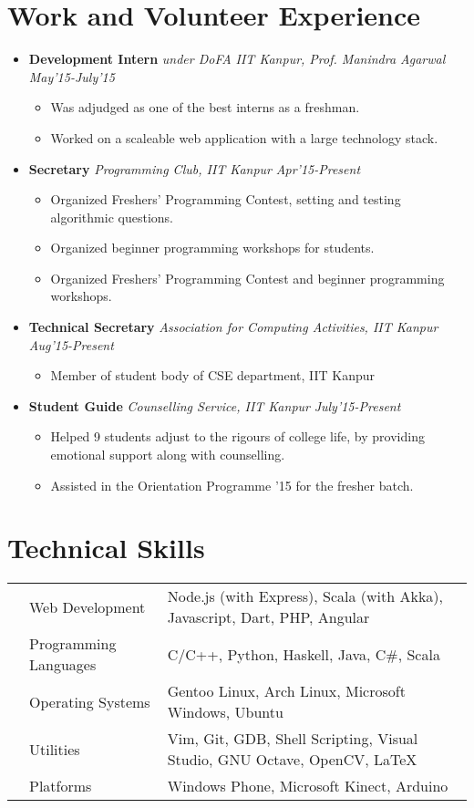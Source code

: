 \documentclass[11pt,a4paper]{moderncv}
\newcommand{\experience}[4]{
\vspace{0.1cm}
\item \textbf{\large{#1}} \emph{#2} \hfill \textit{#3}
  \begin{itemize}[leftmargin=*]
    \setlength\itemsep{0em} #4
  \end{itemize}
}
\newcommand{\onepage}[1]{
\ifdefined\onep
#1
\fi
}
\newcommand{\twopage}[1]{
\ifdefined\twop
#1
\fi
}
\newcommand{\secspace}{
\onepage{\vspace{-0.27cm}}
\twopage{\vspace{-0.1cm}}
}
\newcommand{\secbelow}{
\onepage{\vspace{-0.07cm}}
}
\begin{document}
\section*{Work and Volunteer Experience}
\secbelow
\begin{itemize}
  \twopage{\setlength\itemsep{0.5em}}
    \experience{Development Intern}{under DoFA IIT Kanpur, Prof. Manindra Agarwal}{May'15-July'15}{
      \item Was adjudged as one of the best interns as a freshman.
      \item Worked on a scaleable web application with a large technology stack.
      }

    \experience{Secretary}{Programming Club, IIT Kanpur}{Apr'15-Present}{
      \twopage{
      \item Organized Freshers' Programming Contest, setting and testing algorithmic questions.
      \item Organized beginner programming workshops for students.
      }
      \onepage{
      \item Organized Freshers' Programming Contest and beginner programming workshops.
      }
    }

    \experience{Technical Secretary}{Association for Computing Activities, IIT Kanpur}{Aug'15-Present}{
      \item Member of student body of CSE department, IIT Kanpur
      }
      
    \twopage{
      \experience{Student Guide}{Counselling Service, IIT Kanpur}{July'15-Present}{
        \item Helped 9 students adjust to the rigours of college life, by providing emotional support along with counselling.
        \item Assisted in the Orientation Programme '15 for the fresher batch.
      }
    }

\end{itemize}

\secspace
\section*{Technical Skills}
\secbelow
\begin{tabular}{L{0.05cm} L{5cm} l}
  &Web Development 	          &Node.js (with Express), Scala (with Akka), Javascript, Dart, PHP, Angular\\
  &Programming Languages      &C/C++, Python, Haskell, Java, C\#, Scala\\
  &Operating Systems	        &Gentoo Linux, Arch Linux, Microsoft Windows, Ubuntu\\
  &Utilities                  &Vim, Git, GDB, Shell Scripting, Visual Studio, GNU Octave, OpenCV, \LaTeX\\
  &Platforms                  &Windows Phone, Microsoft Kinect, Arduino
\end{tabular}
\end{document}
